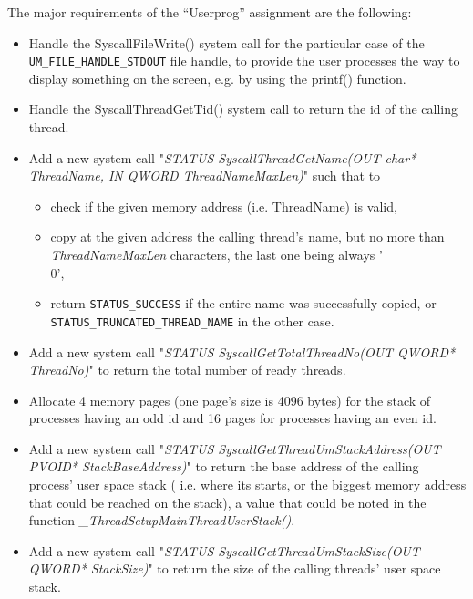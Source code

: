 The major requirements of the ``Userprog'' assignment are the following:
\begin{itemize}
    \item Handle the SyscallFileWrite() system call for the particular case of the \texttt{UM\_FILE\_HANDLE\_STDOUT} file handle, to provide the user processes the way to display something on the screen, e.g. by using the printf() function.
    \item Handle the SyscallThreadGetTid() system call to return the id of the calling thread.
    \item Add a new system call "\textit{STATUS SyscallThreadGetName(OUT char* ThreadName, IN QWORD ThreadNameMaxLen)}" such that to
        \begin{itemize}
         \item check if the given memory address (i.e. ThreadName) is valid,
         \item copy at the given address the calling thread's name, but no more than \textit{ThreadNameMaxLen} characters, the last one being always '\\0',
         \item return \texttt{STATUS\_SUCCESS} if the entire name was successfully copied, or \texttt{STATUS\_TRUNCATED\_THREAD\_NAME} in the other case. 

        \end{itemize}

    \item Add a new system call "\textit{STATUS SyscallGetTotalThreadNo(OUT QWORD* ThreadNo)}" to return the total number of ready threads.
    
    \item Allocate 4 memory pages (one page's size is 4096 bytes) for the stack of processes having an odd id and 16 pages for processes having an even id.
    
    \item Add a new system call "\textit{STATUS SyscallGetThreadUmStackAddress(OUT PVOID* StackBaseAddress)}" to return the base address of the calling process' user space stack ( i.e. where its starts, or the biggest memory address that could be reached on the stack), a value that could be noted in the function \textit{\_ThreadSetupMainThreadUserStack()}. 

    \item Add a new system call "\textit{STATUS SyscallGetThreadUmStackSize(OUT QWORD* StackSize)}" to return the size of the calling threads' user space stack.


\end{itemize}
